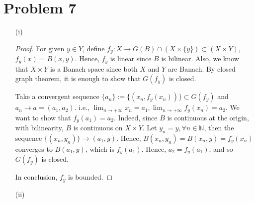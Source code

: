 \documentclass[12pt]{article}
\begin{document}
\section*{Problem 7}

\begin{enumerate}

\item [(i)]

\begin{proof}

For given $y\in Y$, define $f_y: X \rightarrow G(B)\cap (X\times\{y\}) \subset (X\times Y)$, $f_y(x) = B(x, y)$. Hence, $f_y$ is linear since $B$ is bilinear. Also, we know that $X\times Y$ is a Banach space since both $X$ and $Y$ are Banach. By closed graph theorem, it is enough to show that $G(f_y)$ is closed.

Take a convergent sequence $\{a_n\}:= \{(x_n, f_y(x_n))\} \subset G(f_y)$ and $a_n \rightarrow a = (a_1, a_2)$. i.e., $\lim_{n\rightarrow +\infty} x_n = a_1, \lim_{n\rightarrow +\infty} f_y(x_n) = a_2$. We want to show that $f_y(a_1) = a_2$. Indeed, since $B$ is continuous at the origin, with bilinearity, $B$ is continuous on $X\times Y$. Let $y_n = y, \forall n\in \mathbb N$, then the sequence $\{(x_n, y_n)\}\rightarrow (a_1, y)$. Hence, $B(x_n, y_n) = B(x_n, y) = f_y(x_n)$ converges to $B(a_1, y)$, which is $f_y(a_1)$. Hence, $a_2 = f_y(a_1)$, and so $G(f_y)$ is closed.

In conclusion, $f_y$ is bounded. 

\end{proof}


\item[(ii)]



\end{enumerate}
\end{document}
